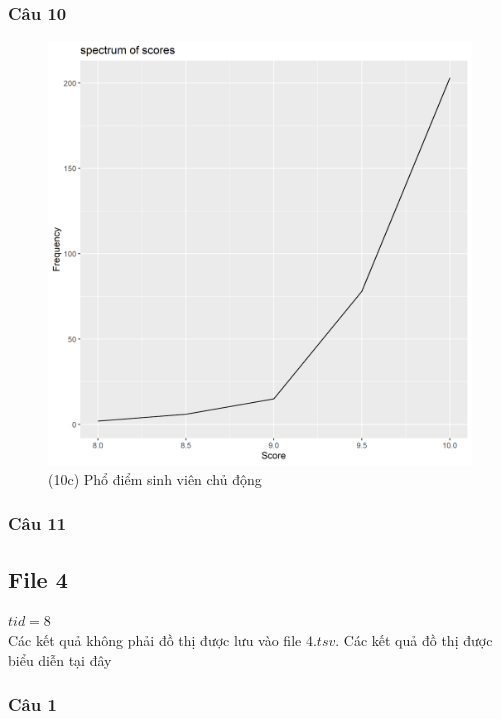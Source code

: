 \documentclass[a4paper]{article}
\theoremstyle{definition}
\begin{document}
\subsubsection{Câu 10}
\newpage
\begin{figure}[!ht]
    \centering
    \includegraphics[scale=0.4]{Pics/q10c_file3.png}
    \caption{(10c) Phổ điểm sinh viên chủ động}
    \label{fig:my_label}
\end{figure}
\newpage
\subsubsection{Câu 11}

\newpage 
\subsection{File 4}\textbf{$tid = 8$}\\
Các kết quả không phải đồ thị được lưu vào file $4.tsv$. Các kết quả đồ thị được biểu diễn tại đây
\subsubsection{Câu 1}
\end{document}
